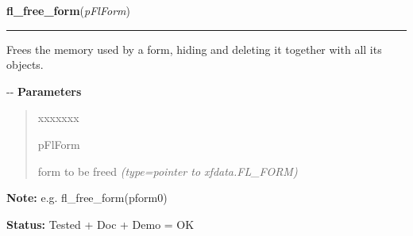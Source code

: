     \label{xformslib:flbasic:fl_free_form}

    \vspace{0.5ex}

\hspace{.8\funcindent}\begin{boxedminipage}{\funcwidth}

    \raggedright \textbf{fl\_free\_form}(\textit{pFlForm})

    \vspace{-1.5ex}

    \rule{\textwidth}{0.5\fboxrule}
\setlength{\parskip}{2ex}

Frees the memory used by a form, hiding and deleting it together
with all its objects.

-{}-
\setlength{\parskip}{1ex}
      \textbf{Parameters}
      \vspace{-1ex}

      \begin{quote}
        \begin{Ventry}{xxxxxxx}

          \item[pFlForm]


form to be freed
            {\it (type=pointer to xfdata.FL\_FORM)}

        \end{Ventry}

      \end{quote}

\textbf{Note:} 
e.g. fl\_free\_form(pform0)


\textbf{Status:} 
Tested + Doc + Demo = OK


    \end{boxedminipage}

    \label{xformslib:flbasic:fl_redraw_form}

    \vspace{0.5ex}

